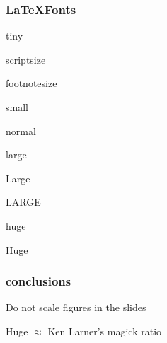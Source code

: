 \begin{frame}\frametitle{\LaTeX Fonts}
\tiny tiny

\scriptsize scriptsize

\footnotesize footnotesize

\small small

\normalsize normal

\large large

\Large Large

\LARGE LARGE 

\huge huge

\Huge Huge

\end{frame}


\usebackgroundtemplate{}

\begin{frame}\frametitle{conclusions}
Do not scale figures in the slides

Huge $\approx$ Ken Larner's magick ratio

\end{frame}
